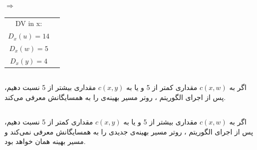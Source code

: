 \documentclass{article}
\begin{document}
\begin{latin}
$\Rightarrow$

\begin{table}[H]
\begin{tabular}{cl}
\cline{1-1}
\multicolumn{1}{|c|}{DV in x:} &  \\ \cline{1-1}
$D_x(u) = 14$                  &  \\
$D_x(w) = 5$                   &  \\
$D_x(y) = 4$                   & 
\end{tabular}
\end{table}
\end{latin}
\subsection{}
اگر به $c(x, w)$ مقداری کمتر از 5 و یا به $c(x, y)$ مقداری بیشتر از 5 نسبت دهیم، پس از اجرای الگوریتم ، روتر  مسیر بهینه‌ی  را به همسایگانش معرفی می‌کند.
\subsection{}
اگر به $c(x, w)$ مقداری بیشتر از 5 و یا به $c(x, y)$ مقداری کمتر از 5 نسبت دهیم، پس از اجرای الگوریتم ، روتر  مسیر بهینه‌ی جدیدی را به همسایگانش معرفی نمی‌کند و مسیر بهینه همان  خواهد بود.
\end{document}
